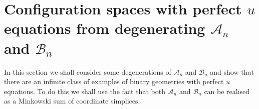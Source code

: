 \documentclass[hidelinks,12pt]{article}
\begin{document}
%

\section{Configuration spaces with perfect $u$ equations from degenerating ${\mathscr A_n}$ and ${\mathscr B_n}$}
In this section we shall consider some degenerations of ${\mathscr A_n}$ and ${\mathscr B_n}$ and show that there are an infinite class of examples of binary geometries with perfect $u$ equations. To do this we shall use the fact that both ${\mathscr A_n}$ and ${\mathscr B_n}$ can be realised as a Minkowski sum of coordinate simplices. %
\end{document}
